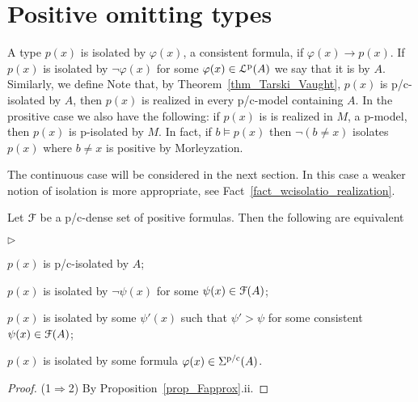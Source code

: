 \documentclass[10pt,oneside]{amsproc}
\newcommand{\mylabel}[1]{{#1}\hfill}
\renewenvironment{itemize}
  {\begin{list}{$\triangleright$}{%
  \setlength{\parskip}{0mm}
  \setlength{\topsep}{.4\baselineskip}
  \setlength{\rightmargin}{0mm}
  \setlength{\listparindent}{0mm}
  \setlength{\itemindent}{0mm}
  \setlength{\labelwidth}{3ex}
  \setlength{\itemsep}{.2\baselineskip}
  \setlength{\parsep}{.2\baselineskip}
  \setlength{\partopsep}{0mm}
  \setlength{\labelsep}{1ex}
  \setlength{\leftmargin}{\labelwidth+\labelsep}
  \let\makelabel\mylabel}}{%
\end{list}}
\renewcommand*{\emph}[1]{%
   \smash{\tikz[baseline]\node[rectangle, fill=teal!25, rounded corners, inner xsep=0.5ex, inner ysep=0.2ex, anchor=base, minimum height = 2.7ex]{\strut #1};}}
\begin{document}
{%
\section{Positive omitting types}

\def\ceq#1#2#3{\parbox[t]{30ex}{$\displaystyle #1$}\parbox{4ex}{\hfil $#2$}{$\displaystyle #3$}}

A type $p(x)$ is isolated by $\varphi(x)$, a consistent formula, if $\varphi(x)\rightarrow p(x)$.
If $p(x)$ is isolated by $\neg\varphi(x)$ for some $\varphi(x)\in{\EuScript L}^{\rm p}(A)$ we say that it is \emph{p-isolated\/} by $A$.
Similarly, we define \emph{c-isolated.}
Note that, by Theorem~\ref{thm_Tarski_Vaught}, $p(x)$ is p/c-isolated by $A$, then $p(x)$ is realized in every p/c-model containing $A$.
In the prositive case we also have the following: if $p(x)$ is is realized in $M$, a p-model, then $p(x)$ is p-isolated by $M$.
In fact, if $b\models p(x)$ then $\neg(b\neq x)$ isolates $p(x)$ where $b\neq x$ is positive by Morleyzation.

The continuous case will be considered in the next section.
In this case a weaker notion of isolation is more appropriate, see Fact~\ref{fact_wcisolatio_realization}.

\begin{fact}\label{fact_isolation}
  Let ${\EuScript F}$ be a p/c-dense set of positive formulas.
  Then the following are equivalent
  \begin{itemize}
  \item[1.] $p(x)$ is p/c-isolated by $A$;
  \item[2.] $p(x)$ is isolated by $\neg\psi(x)$ for some $\psi(x)\in{\EuScript F}(A)$;
  \item[3.] $p(x)$ is isolated by some $\psi'(x)$ such that  $\psi'>\psi$ for some consistent $\psi(x)\in{\EuScript F}(A)$;
  \item[4.] $p(x)$ is isolated by some formula $\varphi(x)\in\Sigma^{\rm p/c}(A)$.
  \end{itemize}
\end{fact}

\begin{proof}
  (1$\Rightarrow$2) By Proposition~\ref{prop_Fapprox}.ii.


\end{proof}}
\end{document}
